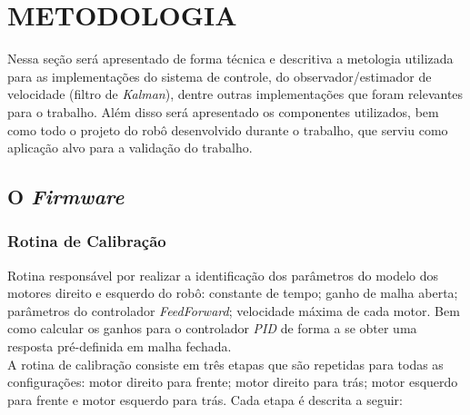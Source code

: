 \section{METODOLOGIA}
Nessa seção será apresentado de forma técnica e descritiva a metologia utilizada para as implementações do sistema de controle, do observador/estimador de velocidade (filtro de \emph{Kalman}), dentre outras implementações que foram relevantes para o trabalho. Além disso será apresentado os componentes utilizados, bem como todo o projeto do robô desenvolvido durante o trabalho, que serviu como aplicação alvo para a validação do trabalho.



\subsection{O \emph{Firmware}}

\subsubsection{Rotina de Calibração}

Rotina responsável por realizar a identificação dos parâmetros do modelo dos motores direito e esquerdo do robô: constante de tempo; ganho de malha aberta; parâmetros do controlador \emph{FeedForward}; velocidade máxima de cada motor. Bem como calcular os ganhos para o controlador \emph{PID} de forma a se obter uma resposta pré-definida em malha fechada.\\

A rotina de calibração consiste em três etapas que são repetidas para todas as configurações: motor direito para frente; motor direito para trás; motor esquerdo para frente e motor esquerdo para trás. Cada etapa é descrita a seguir: 

